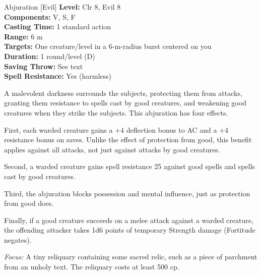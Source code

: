 {Abjuration [Evil]}
{
	\textbf{Level:}
	Clr 8, Evil 8\\
	\textbf{Components:}
	V, S, F\\
	\textbf{Casting Time:}
	1 standard action\\
	\textbf{Range:}
	6 m\\
	\textbf{Targets:}
	One creature/level in a 6-m-radius burst centered on you\\
	\textbf{Duration:}
	1 round/level (D)\\
	\textbf{Saving Throw:}
	See text\\
	\textbf{Spell Resistance:}
	Yes (harmless)\\
}
{
	A malevolent darkness surrounds the subjects, protecting them from attacks, granting them resistance to spells cast by good creatures, and weakening good creatures when they strike the subjects. This abjuration has four effects.

	First, each warded creature gains a +4 deflection bonus to AC and a +4 resistance bonus on saves. Unlike the effect of protection from good, this benefit applies against all attacks, not just against attacks by good creatures.

	Second, a warded creature gains spell resistance 25 against good spells and spells cast by good creatures.

	Third, the abjuration blocks possession and mental influence, just as protection from good does.

	Finally, if a good creature succeeds on a melee attack against a warded creature, the offending attacker takes 1d6 points of temporary Strength damage (Fortitude negates).

	\textit{Focus:}
	A tiny reliquary containing some sacred relic, such as a piece of parchment from an unholy text. The reliquary costs at least 500 cp.

}
